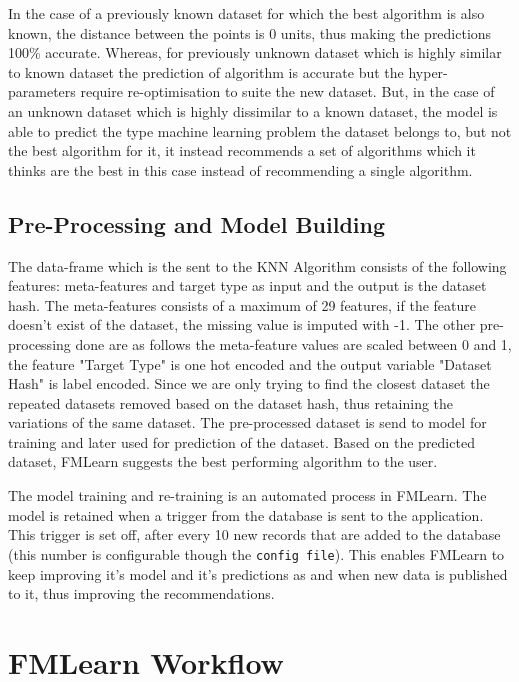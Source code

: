 In the case of a previously known dataset for which the best algorithm is also known, the distance between the points is 0 units, thus making the predictions 100\% accurate. Whereas, for previously unknown dataset which is highly similar to known dataset the prediction of algorithm is accurate but the hyper-parameters require re-optimisation to suite the new dataset. But, in the case of an unknown dataset which is highly dissimilar to a known dataset, the model is able to predict the type machine learning problem the dataset belongs to, but not the best algorithm for it, it instead recommends a set of algorithms which it thinks are the best in this case instead of recommending a single algorithm.
   

\subsection{Pre-Processing and Model Building}
\label{model-building}

The data-frame which is the sent to the KNN Algorithm consists of the following features: meta-features and target type as input and the output is the dataset hash. The meta-features consists of a maximum of 29 features, if the feature doesn't exist of the dataset, the missing value is imputed with -1. The other pre-processing done are as follows the meta-feature values are scaled between 0 and 1, the feature "Target Type" is one hot encoded and the output variable "Dataset Hash" is label encoded. Since we are only trying to find the closest dataset the repeated datasets removed based on the dataset hash, thus retaining the variations of the same dataset. The pre-processed dataset is send to model for training and later used for prediction of the dataset. Based on the predicted dataset, FMLearn suggests the best performing algorithm to the user.

The model training and re-training is an automated process in FMLearn. The model is retained when a trigger from the database is sent to the application. This trigger is set off, after every 10 new records that are added to the database (this number is configurable though the \texttt{config file}). This enables FMLearn to keep improving it's model and it's predictions as and when new data is published to it, thus improving the recommendations.

\section{FMLearn Workflow}

